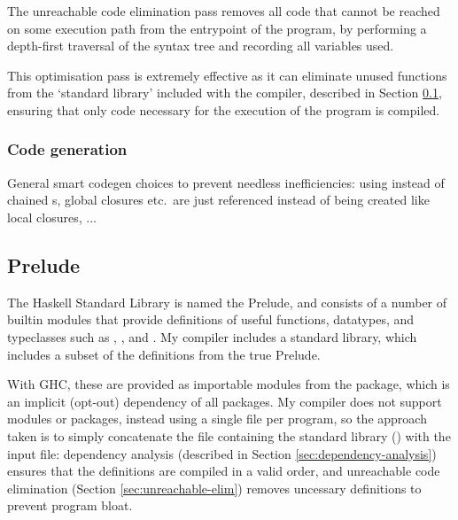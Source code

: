 \documentclass[dissertation.tex]{subfiles}
\begin{document}
{{{            The unreachable code elimination pass removes all code that cannot be reached on some execution path from
            the entrypoint of the program, by performing a depth-first traversal of the syntax tree and recording all
            variables used.

            This optimisation pass is extremely effective as it can eliminate unused functions from the `standard
            library' included with the compiler, described in Section \ref{sec:prelude}, ensuring that only code
            necessary for the execution of the program is compiled.

        }
        \subsubsection{Code generation}
        {

            General smart codegen choices to prevent needless inefficiencies: using  instead of
            chained s, global closures etc.\ are just referenced instead of being created like local
            closures, ...


        }
    }
    \subsection{Prelude}\label{sec:prelude}
    {

        The Haskell Standard Library is named the Prelude, and consists of a number of builtin modules that provide
        definitions of useful functions, datatypes, and typeclasses such as , , and
        . My compiler includes a standard library, which includes a subset of the definitions from the
        true Prelude.
        
        With GHC, these are provided as importable modules from the  package, which is an implicit
        (opt-out) dependency of all packages. My compiler does not support modules or packages, instead using a single
        file per program, so the approach taken is to simply concatenate the file containing the standard library
        () with the input file: dependency analysis (described in Section
        \ref{sec:dependency-analysis}) ensures that the definitions are compiled in a valid order, and unreachable code
        elimination (Section \ref{sec:unreachable-elim}) removes uncessary definitions to prevent program bloat.

    }
}
\end{document}
